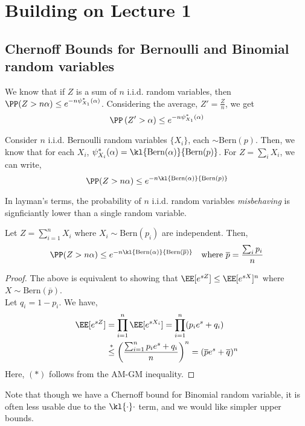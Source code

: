 \chapter{Building on Lecture 1}
\section{Chernoff Bounds for Bernoulli and Binomial random variables}
We know that if $Z$ is a sum of $n$ i.i.d. random variables, then $\PP(Z > n\alpha) \leq e^{-n\psi_{X_1}^*(\alpha)}$. Considering the average, $Z' = \frac{Z}{n}$, we get
\[
\PP\left( Z' > \alpha\right) \leq e^{-n\psi_{X_1}^*(\alpha)}
\]
\begin{eg}
Consider $n$ i.i.d. Bernoulli random variables $\{X_i\}$, each $\sim \text{Bern}(p)$. Then, we know that for each $X_i$, $\psi_{X_i}^*(\alpha) = \kl{\text{Bern}(\alpha)}{\text{Bern}(p)}$. For $Z = \sum_i X_i$, we can write, 
\[
\PP(Z > n \alpha) \leq e^{-n  \kl{\text{Bern}(\alpha)}{\text{Bern}(p)}}
\]
\end{eg}
In layman's terms, the probability of $n$ i.i.d. random variables \textit{misbehaving} is signficiantly lower than a single random variable.
\begin{theorem} Let $Z = \sum_{i=1}^n X_i$ where $X_i \sim \text{Bern}(p_i)$ are independent. Then, 
\begin{equation}
\PP(Z > n\alpha) \leq e^{-n  \kl{\text{Bern}(\alpha)}{\text{Bern}(\overline{p})}} \quad \text{where $\overline p = \frac{\sum_i p_i}{n}$}
\end{equation}
\end{theorem}
\begin{proof}
The above is equivalent to showing that $\EE[e^{sZ}] \leq \EE[e^{sX}]^n$ where $X \sim \text{Bern}(\overline p)$. \\
Let $q_i = 1-p_i$. We have,
\begin{align*}
    \EE[e^{sZ}] &= \prod_{i=1}^n \EE[e^{sX_i}] = \prod_{i=1}^n (p_i e^s + q_i) \\
    &\stackrel{*}{\leq} \left(\frac{\sum_{i=1}^n p_i e^s + q_i}{n}\right)^n = (\overline{p}e^s + \overline{q})^n
\end{align*}
Here, $(*)$ follows from the AM-GM inequality.
\end{proof}
Note that though we have a Chernoff bound for Binomial random variable, it is often less usable due to the $\kl{\cdot}\cdot$ term, and we would like simpler upper bounds.
